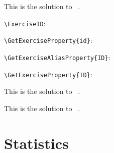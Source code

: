 \documentclass{article}
\begin{document}
\begin{problem}[points=1]
  \lipsum[3]
\end{problem}
\begin{answer}
  This is the solution to \ExerciseType\ .
\end{answer}

\begin{exercise}[ID=test]
  \lipsum[5]

  \verb+\ExerciseID+: 
  
  \verb+\GetExerciseProperty{id}+: 
  
  \verb+\GetExerciseAliasProperty{ID}+: 
  
  \verb+\GetExerciseProperty{ID}+: 
\end{exercise}
\begin{solution}
  This is the solution to \ExerciseType\ .
\end{solution}

\begin{exercise}[print=false,use=false]
  \lipsum[5]
\end{exercise}
\begin{solution}
  This is the solution to \ExerciseType\ .
\end{solution}


\printsolutions*

\section{Statistics}


\bigskip

\end{document}
